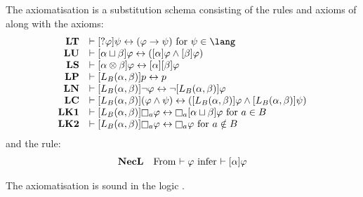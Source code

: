 \begin{definition}\label{afl-k-axioms}
The axiomatisation \axiomAflK{} is a substitution schema consisting of the rules and axioms of \axiomK{} along with the axioms:
$$
\begin{array}{rl}
    {\bf LT} & \proves \actionA{\test{\phi}} \psi \iff (\phi \implies \psi) \text{ for } \psi \in \lang\\
    {\bf LU} & \proves \actionA{\alpha \choice \beta} \phi \iff (\actionA{\alpha} \phi \land \actionA{\beta} \phi)\\
    {\bf LS} & \proves \actionA{\alpha \compose \beta} \phi \iff \actionA{\alpha} \actionA{\beta} \phi\\
    {\bf LP} & \proves \actionA{\learnsBs (\alpha, \beta)} \atomP \iff \atomP\\
    {\bf LN} & \proves \actionA{\learnsBs (\alpha, \beta)} \neg \phi \iff \neg \actionA{\learnsBs (\alpha, \beta)} \phi\\
    {\bf LC} & \proves \actionA{\learnsBs (\alpha, \beta)} (\phi \land \psi) \iff (\actionA{\learnsBs (\alpha, \beta)} \phi \land \actionA{\learnsBs (\alpha, \beta)} \psi)\\
    {\bf LK1} & \proves \actionA{\learnsBs (\alpha, \beta)} \necessaryA \phi \iff \necessaryA \actionA{\alpha \choice \beta} \phi \text{ for } \agentA \in \agentsB\\
    {\bf LK2} & \proves \actionA{\learnsBs (\alpha, \beta)} \necessaryA \phi \iff \necessaryA \phi \text{ for } \agentA \notin \agentsB
\end{array}
$$
and the rule:
$$
\begin{array}{rl}
    {\bf NecL} & \text{From $\vdash \varphi$ infer $\vdash {[ {\alpha} ]} \varphi$}
\end{array}
$$
\end{definition}

\begin{proposition}\label{afl-k-axioms-soundness}
The axiomatisation \axiomAflK{} is sound in the logic \logicAmlK{}.
\end{proposition}


